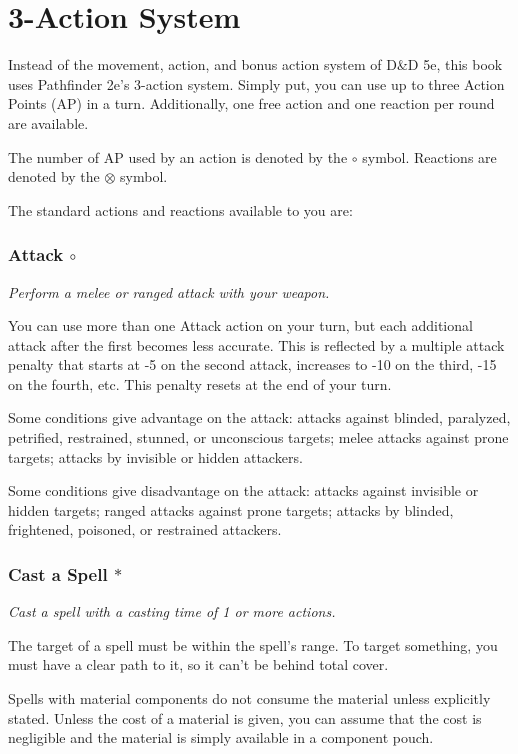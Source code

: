 \section{3-Action System} \label{sec::3actionsystem}
Instead of the movement, action, and bonus action system of D\&D 5e, this book uses Pathfinder 2e's 3-action system.
Simply put, you can use up to three Action Points (AP) in a turn.
Additionally, one free action and one reaction per round are available.

The number of AP used by an action is denoted by the $\circ$ symbol.
Reactions are denoted by the $\otimes$ symbol.

The standard actions and reactions available to you are:

\subsubsection{Attack $\circ$} \label{act::attack}
    \textit{Perform a melee or ranged attack with your weapon.}

    You can use more than one Attack action on your turn, but each additional attack after the first becomes less accurate.
    This is reflected by a multiple attack penalty that starts at -5 on the second attack, increases to -10 on the third, -15 on the fourth, etc.
    This penalty resets at the end of your turn.

    Some conditions give advantage on the attack: attacks against blinded, paralyzed, petrified, restrained, stunned, or unconscious targets; melee attacks against prone targets; attacks by invisible or hidden attackers.

    Some conditions give disadvantage on the attack: attacks against invisible or hidden targets; ranged attacks against prone targets; attacks by blinded, frightened, poisoned, or restrained attackers.
\subsubsection{Cast a Spell $\ast$} \label{act::castaspell}
    \textit{Cast a spell with a casting time of 1 or more actions.}

    The target of a spell must be within the spell's range.
    To target something, you must have a clear path to it, so it can't be behind total cover.

    Spells with material components do not consume the material unless explicitly stated.
    Unless the cost of a material is given, you can assume that the cost is negligible and the material is simply available in a component pouch.

